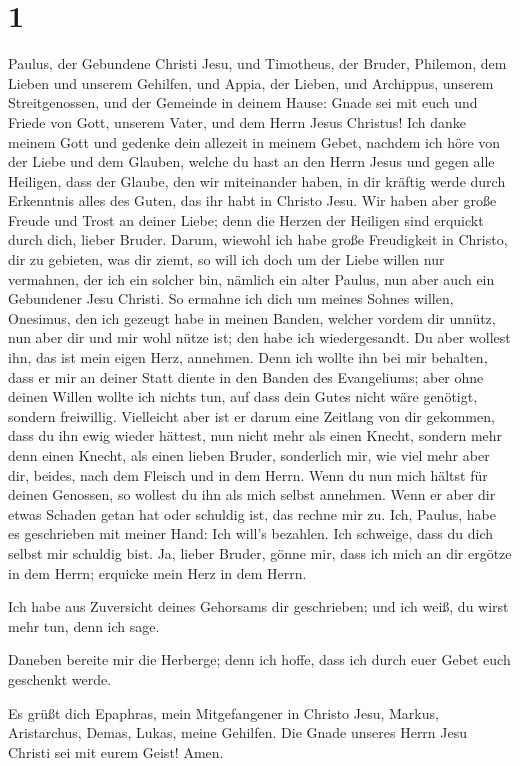\hypertarget{section}{%
\section{1}\label{section}}

 Paulus, der Gebundene Christi Jesu, und Timotheus, der
Bruder, Philemon, dem Lieben und unserem Gehilfen,  und
Appia, der Lieben, und Archippus, unserem Streitgenossen, und der
Gemeinde in deinem Hause:  Gnade sei mit euch und Friede
von Gott, unserem Vater, und dem Herrn Jesus Christus! 
Ich danke meinem Gott und gedenke dein allezeit in meinem Gebet,
 nachdem ich höre von der Liebe und dem Glauben, welche du
hast an den Herrn Jesus und gegen alle Heiligen,  dass der
Glaube, den wir miteinander haben, in dir kräftig werde durch Erkenntnis
alles des Guten, das ihr habt in Christo Jesu.  Wir haben
aber große Freude und Trost an deiner Liebe; denn die Herzen der
Heiligen sind erquickt durch dich, lieber Bruder.  Darum,
wiewohl ich habe große Freudigkeit in Christo, dir zu gebieten, was dir
ziemt,  so will ich doch um der Liebe willen nur
vermahnen, der ich ein solcher bin, nämlich ein alter Paulus, nun aber
auch ein Gebundener Jesu Christi.  So ermahne ich dich um
meines Sohnes willen, Onesimus, den ich gezeugt habe in meinen Banden,
 welcher vordem dir unnütz, nun aber dir und mir wohl
nütze ist; den habe ich wiedergesandt.  Du aber wollest
ihn, das ist mein eigen Herz, annehmen.  Denn ich wollte
ihn bei mir behalten, dass er mir an deiner Statt diente in den Banden
des Evangeliums;  aber ohne deinen Willen wollte ich
nichts tun, auf dass dein Gutes nicht wäre genötigt, sondern freiwillig.
 Vielleicht aber ist er darum eine Zeitlang von dir
gekommen, dass du ihn ewig wieder hättest,  nun nicht
mehr als einen Knecht, sondern mehr denn einen Knecht, als einen lieben
Bruder, sonderlich mir, wie viel mehr aber dir, beides, nach dem Fleisch
und in dem Herrn.  Wenn du nun mich hältst für deinen
Genossen, so wollest du ihn als mich selbst annehmen. 
Wenn er aber dir etwas Schaden getan hat oder schuldig ist, das rechne
mir zu.  Ich, Paulus, habe es geschrieben mit meiner
Hand: Ich will's bezahlen. Ich schweige, dass du dich selbst mir
schuldig bist.  Ja, lieber Bruder, gönne mir, dass ich
mich an dir ergötze in dem Herrn; erquicke mein Herz in dem Herrn.

 Ich habe aus Zuversicht deines Gehorsams dir
geschrieben; und ich weiß, du wirst mehr tun, denn ich sage.

 Daneben bereite mir die Herberge; denn ich hoffe, dass
ich durch euer Gebet euch geschenkt werde.

 Es grüßt dich Epaphras, mein Mitgefangener in Christo
Jesu,  Markus, Aristarchus, Demas, Lukas, meine Gehilfen.
 Die Gnade unseres Herrn Jesu Christi sei mit eurem
Geist! Amen.

